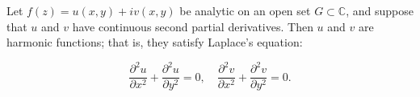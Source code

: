 Let $f(z) = u(x, y) + i v(x, y)$ be analytic on an open set $G \subset \mathbb{C}$, and suppose that $u$ and $v$ have continuous second partial derivatives. Then $u$ and $v$ are harmonic functions; that is, they satisfy Laplace's equation:

$$\frac{\partial^2 u}{\partial x^2} + \frac{\partial^2 u}{\partial y^2} = 0, \quad \frac{\partial^2 v}{\partial x^2} + \frac{\partial^2 v}{\partial y^2} = 0.$$
